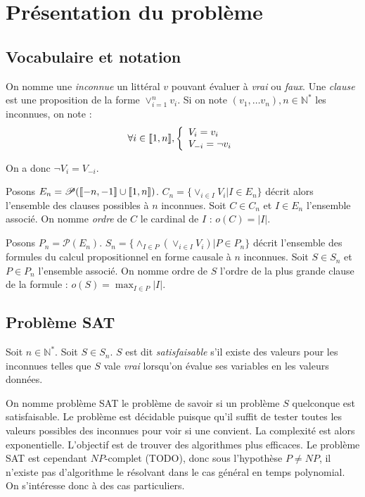 \section{Présentation du problème}
\subsection{Vocabulaire et notation}
On nomme une \emph{inconnue} un littéral $v$ pouvant évaluer à \emph{vrai} ou
\emph{faux}. Une \emph{clause} est une proposition de la forme $\vee_{i=1}^n v_i$.
Si on note $(v_1,\ldots v_n), n\in\mathbb{N}^*$ les inconnues, on note :
    \[ \forall i\in\llbracket 1, n \rrbracket, \left\{\begin{array}{l}
            V_i = v_i \\
            V_{-i} = \neg v_i
       \end{array}\right.
     \]

On a donc $\neg V_i = V_{-i}$.

Posons $E_n = \mathscr{P}(\llbracket -n, -1 \rrbracket\cup\llbracket 1, n \rrbracket)$. $C_n = \{\vee_{i\in I} V_i | I\in E_n\}$
décrit alors l'ensemble des clauses possibles à $n$ inconnues. Soit $C\in C_n$
et $I\in E_n$ l'ensemble associé. On nomme \emph{ordre} de $C$ le cardinal de
$I$ : $o(C) = |I|$.

Posons $P_n = \mathscr{P}(E_n)$. $S_n = \{\wedge_{I\in P} (\vee_{i\in I} V_i) | P\in P_n\}$
décrit l'ensemble des formules du calcul propositionnel en forme causale à $n$
inconnues. Soit $S\in S_n$ et $P\in P_n$ l'ensemble associé. On nomme ordre de
$S$ l'ordre de la plus grande clause de la formule : $o(S) = \max_{I\in P} |I|$.

\subsection{Problème SAT}
Soit $n\in\mathbb{N}^*$. Soit $S\in S_n$. $S$ est dit \emph{satisfaisable} s'il
existe des valeurs pour les inconnues telles que $S$ vale \emph{vrai} lorsqu'on
évalue ses variables en les valeurs données.

On nomme problème SAT le problème de savoir si un problème $S$ quelconque est
satisfaisable. Le problème est décidable puisque qu'il suffit de tester toutes
les valeurs possibles des inconnues pour voir si une convient. La complexité
est alors exponentielle. L'objectif est de trouver des algorithmes plus
efficaces. Le problème SAT est cependant $NP$-complet (TODO), donc sous l'hypothèse
$P\neq NP$, il n'existe pas d'algorithme le résolvant dans le cas général en
temps polynomial. On s'intéresse donc à des cas particuliers.

